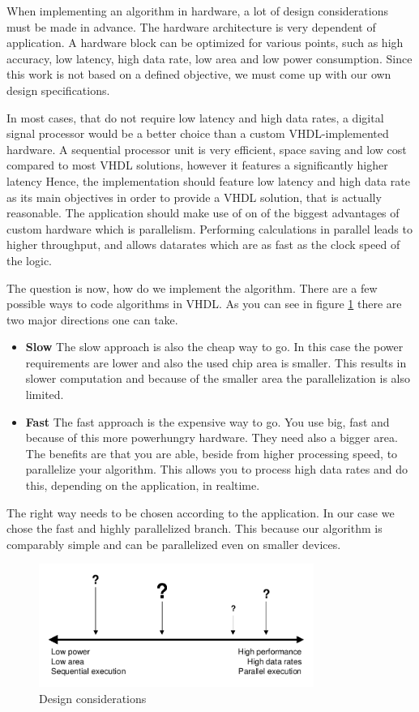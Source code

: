 \begin{refsection}
When implementing an algorithm in hardware, a lot of design considerations must be made in advance.
The hardware architecture is very dependent of application.
A hardware block can be optimized for various points, such as high accuracy, low latency, high data rate, low area and low power consumption.
Since this work is not based on a defined objective, we must come up with our own design specifications.

In most cases, that do not require low latency and high data rates, a digital signal processor would be a better choice than a custom VHDL-implemented hardware.
A sequential processor unit is very efficient, space saving and low cost compared to most VHDL solutions, however it features a significantly higher latency
Hence, the implementation should feature low latency and high data rate as its main objectives in order to provide a VHDL solution, that is actually reasonable.
The application should make use of on of the biggest advantages of custom hardware which is parallelism.
Performing calculations in parallel leads to higher throughput, and allows datarates which are as fast as the clock speed of the logic.



The question is now, how do we implement the algorithm.
There are a few possible ways to code algorithms in VHDL.
As you can see in figure \ref{fpga:designcon} there are two major directions one can take.

\begin{itemize}
	\item \textbf{Slow} The slow approach is also the cheap way to go. In this case the power requirements are lower and also the used chip area is smaller. This results in slower computation and because of the smaller area the parallelization is also limited.
	
	\item \textbf{Fast} The fast approach is the expensive way to go. You use big, fast and because of this more powerhungry hardware. They need also a bigger area. The benefits are that you are able, beside from higher processing speed, to parallelize your algorithm. This allows you to process high data rates and do this, depending on the application, in realtime.  
\end{itemize}
The right way needs to be chosen according to the application. In our case we chose the fast and highly parallelized branch. This because our algorithm is comparably simple and can be parallelized even on smaller devices. 
\begin{figure}
	\centering
	\includegraphics[width=0.8\textwidth]{images/design_considerations.pdf}
	\caption{Design considerations \label{fpga:designcon}}
\end{figure}


\end{refsection}
